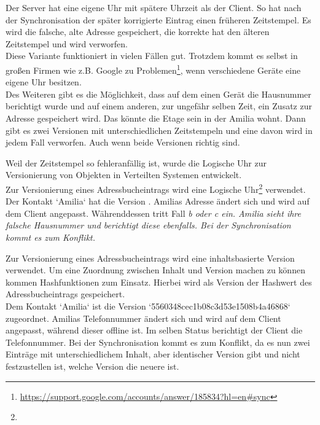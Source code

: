 \begin{description}[leftmargin=0.5cm,style=nextline]
    Der Server hat eine eigene Uhr mit spätere Uhrzeit als der Client.
    So hat nach der Synchronisation der später korrigierte Eintrag einen früheren Zeitstempel.
    Es wird die falsche, alte Adresse gespeichert, die korrekte hat den älteren Zeitstempel und wird verworfen.\\
    Diese Variante funktioniert in vielen Fällen gut. Trotzdem kommt es selbst in großen Firmen wie z.B. Google zu Problemen\footnote{\url{https://support.google.com/accounts/answer/185834?hl=en\#sync}}, wenn verschiedene Geräte eine eigene Uhr besitzen.\\
    Des Weiteren gibt es die Möglichkeit, dass auf dem einen Gerät die Hausnummer berichtigt wurde und auf einem anderen, zur ungefähr selben Zeit, ein Zusatz zur Adresse gespeichert wird. Das könnte die Etage sein in der Amilia wohnt. Dann gibt es zwei Versionen mit unterschiedlichen Zeitstempeln und eine davon wird in jedem Fall verworfen. Auch wenn beide Versionen richtig sind.\\
  \item[Methode V2 -- Logische Uhr:]
    Weil der Zeitstempel so fehleranfällig ist, wurde die Logische Uhr zur Versionierung von Objekten in Verteilten Systemen entwickelt.\\
    Zur Versionierung eines Adressbucheintrags wird eine Logische Uhr\footnote{\logicalclock} verwendet.
    Der Kontakt `Amilia` hat die Version .
    Amilias Adresse ändert sich und wird auf dem Client angepasst.
    Währenddessen tritt Fall \it{b} oder \it{c} ein.
    Amilia sieht ihre falsche Hausnummer und berichtigt diese ebenfalls.
    Bei der Synchronisation kommt es zum Konflikt. \\
  \item[Methode V3 -- Inhaltsbasierte Version:]%
    Zur Versionierung eines Adressbucheintrags wird eine inhaltsbasierte Version verwendet. Um eine Zuordnung zwischen Inhalt und Version machen zu können kommen \Gls{Hash}funktionen zum Einsatz. Hierbei wird als Version der Hashwert des Adressbucheintrags gespeichert.\\
    Dem Kontakt `Amilia` ist die Version `5560348cec1b08c3d53e1508b4a46868` zugeordnet. Amilias Telefonnummer ändert sich und wird auf dem Client angepasst, während dieser offline ist.
    Im selben Status berichtigt der Client die Telefonnummer. Bei der Synchronisation kommt es zum Konflikt, da es nun zwei Einträge mit unterschiedlichem Inhalt, aber identischer Version gibt und nicht festzustellen ist, welche Version die neuere ist.\\

\end{description}
